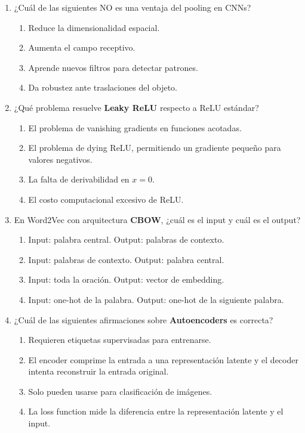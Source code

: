 \documentclass[12pt,a4paper]{article}
\begin{document}
\begin{enumerate}[label=\arabic*)]
    \item ¿Cuál de las siguientes NO es una ventaja del pooling en CNNs?
    \begin{enumerate}[label=\Alph*)]
        \item Reduce la dimensionalidad espacial.
        \item Aumenta el campo receptivo.
        \item Aprende nuevos filtros para detectar patrones.
        \item Da robustez ante traslaciones del objeto.
    \end{enumerate}

    \item ¿Qué problema resuelve \textbf{Leaky ReLU} respecto a ReLU estándar?
    \begin{enumerate}[label=\Alph*)]
        \item El problema de vanishing gradients en funciones acotadas.
        \item El problema de dying ReLU, permitiendo un gradiente pequeño para valores negativos.
        \item La falta de derivabilidad en $x = 0$.
        \item El costo computacional excesivo de ReLU.
    \end{enumerate}

    \item En Word2Vec con arquitectura \textbf{CBOW}, ¿cuál es el input y cuál es el output?
    \begin{enumerate}[label=\Alph*)]
        \item Input: palabra central. Output: palabras de contexto.
        \item Input: palabras de contexto. Output: palabra central.
        \item Input: toda la oración. Output: vector de embedding.
        \item Input: one-hot de la palabra. Output: one-hot de la siguiente palabra.
    \end{enumerate}

    \item ¿Cuál de las siguientes afirmaciones sobre \textbf{Autoencoders} es correcta?
    \begin{enumerate}[label=\Alph*)]
        \item Requieren etiquetas supervisadas para entrenarse.
        \item El encoder comprime la entrada a una representación latente y el decoder intenta reconstruir la entrada original.
        \item Solo pueden usarse para clasificación de imágenes.
        \item La loss function mide la diferencia entre la representación latente y el input.
    \end{enumerate}


\end{enumerate}
\end{document}
